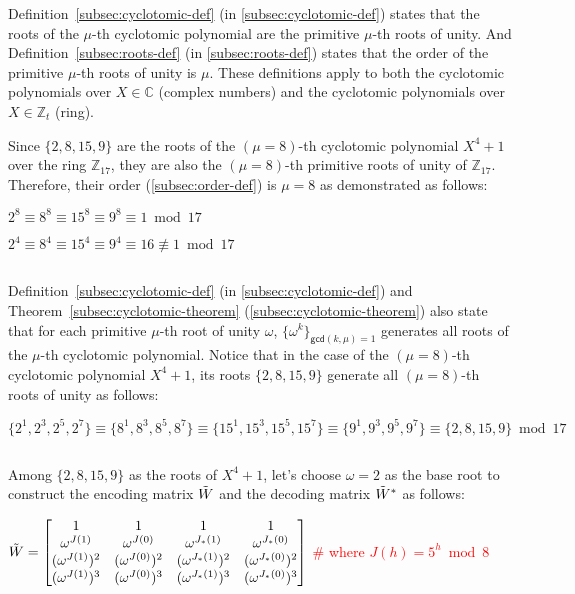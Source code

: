 $ $

Definition~\ref*{subsec:cyclotomic-def} (in \autoref{subsec:cyclotomic-def}) states that the roots of the $\mu$-th cyclotomic polynomial are the primitive $\mu$-th roots of unity. And Definition~\ref*{subsec:roots-def} (in \autoref{subsec:roots-def}) states that the order of the primitive $\mu$-th roots of unity is $\mu$. These definitions apply to both the cyclotomic polynomials over $X\in\mathbb{C}$ (complex numbers) and the cyclotomic polynomials over $X \in \mathbb{Z}_t$ (ring). 

Since $\{2, 8, 15, 9\}$ are the roots of the $(\mu=8)$-th cyclotomic polynomial $X^4 + 1$ over the ring $\mathbb{Z}_{17}$, they are also the $(\mu=8)$-th primitive roots of unity of $\mathbb{Z}_{17}$. Therefore, their order (\autoref{subsec:order-def}) is $\mu=8$ as demonstrated as follows: 

$2^8 \equiv 8^8 \equiv 15^8 \equiv 9^8 \equiv 1 \bmod 17$

$2^4 \equiv 8^4 \equiv 15^4 \equiv 9^4 \equiv 16 \not\equiv 1 \bmod 17$

$ $

Definition~\ref*{subsec:cyclotomic-def} (in \autoref{subsec:cyclotomic-def}) and Theorem~\ref*{subsec:cyclotomic-theorem} (\autoref{subsec:cyclotomic-theorem}) also state that for each primitive $\mu$-th root of unity $\omega$, $\{\omega^k\}_{\textsf{gcd}(k, \mu) = 1}$ generates all roots of the $\mu$-th cyclotomic polynomial. Notice that in the case of the $(\mu=8)$-th cyclotomic polynomial $X^4 + 1$, its roots $\{2, 8, 15, 9\}$ generate all $(\mu=8)$-th roots of unity as follows:

$\{2^1, 2^3, 2^5, 2^7\} \equiv \{8^1, 8^3, 8^5, 8^7\} \equiv \{15^1, 15^3, 15^5, 15^7\} \equiv \{9^1, 9^3, 9^5, 9^7\} \equiv \{2, 8, 15, 9\} \bmod 17$

$ $

Among $\{2, 8, 15, 9\}$ as the roots of $X^4 + 1$, let's choose $\omega = 2$ as the base root to construct the encoding matrix $\tilde{W}$ and the decoding matrix $\tilde{W}^*$ as follows: 

$\tilde{W} = \begin{bmatrix}
1 & 1 & 1 & 1\\
\omega^{J(1)} & \omega^{J(0)} & \omega^{J_*(1)} & \omega^{J_*(0)}\\
(\omega^{J(1)})^2 & (\omega^{J(0)})^2 & (\omega^{J_*(1)})^2 & (\omega^{J_*(0)})^2\\
(\omega^{J(1)})^3 & (\omega^{J(0)})^3 & (\omega^{J_*(1)})^3 & (\omega^{J_*(0)})^3\\
\end{bmatrix}$ \textcolor{red}{\text{ } \# where $J(h) = 5^h \bmod 8$}

